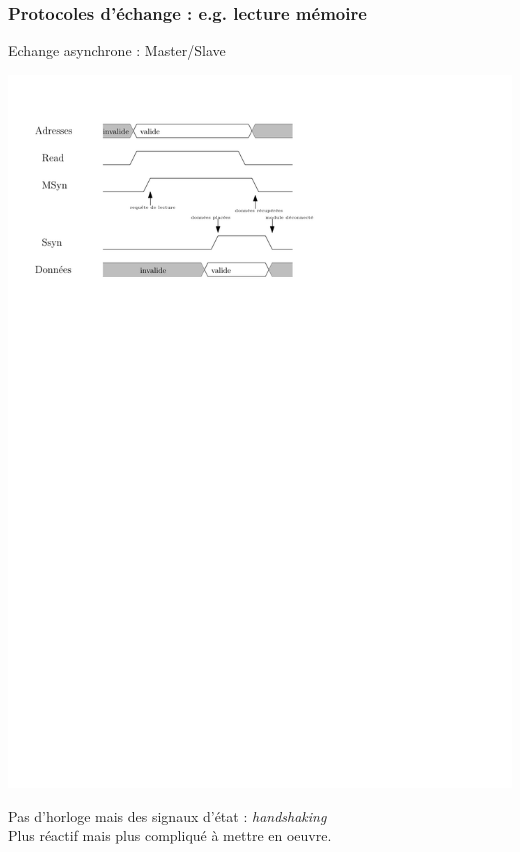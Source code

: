 \documentclass{beamer}
\begin{document}
\begin{frame}

\frametitle{Protocoles d'échange : e.g. lecture mémoire}

\begin{block}{Echange asynchrone : Master/Slave}

\centering\includegraphics[width=0.7\linewidth]{Figs/async_comm.pdf}

\end{block}

Pas d'horloge mais des signaux d'état : \emph{handshaking}\\
Plus réactif mais plus compliqué à mettre en oeuvre.

\end{frame}
\end{document}
